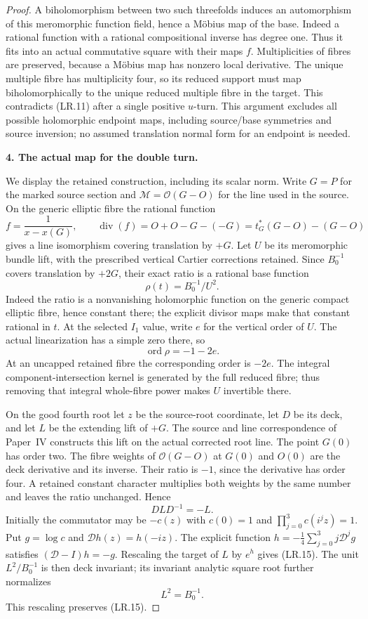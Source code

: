 \begin{proof}
A biholomorphism between two such threefolds induces an automorphism
of this meromorphic function field, hence a Möbius map of the base.
Indeed a rational function with a rational compositional inverse
has degree one. Thus it fits into an actual commutative square with
their maps \(f\). Multiplicities of fibres are preserved, because a
Möbius map has nonzero local derivative. The unique multiple fibre
has multiplicity four, so its reduced support must map biholomorphically
to the unique reduced multiple fibre in the target. This contradicts
(LR.11) after a single positive \(u\)-turn. This argument excludes
all possible holomorphic endpoint maps, including source/base
symmetries and source inversion; no assumed translation normal form
for an endpoint is needed.

\par


\medskip\noindent\textbf{4. The actual map for the double turn.}\par\nobreak
We display the retained construction, including its scalar norm.
Write $G=P$ for the marked source section and
$\mathcal M=\mathcal O(G-O)$ for the line used in the source.
On the generic elliptic fibre the rational function
\[
 f=\frac1{x-x(G)},\qquad
 \operatorname{div}(f)=O+O-G-(-G)
                       =t_G^*(G-O)-(G-O)
\]
gives a line isomorphism covering translation by $+G$.
Let $U$ be its meromorphic bundle lift, with the prescribed
vertical Cartier corrections retained. Since $B_0^{-1}$
covers translation by $+2G$, their exact ratio is a rational
base function
\[
              \rho(t)=B_0^{-1}/U^2.\tag{LR.13}
\]
Indeed the ratio is a nonvanishing holomorphic function on the
generic compact elliptic fibre, hence constant there; the
explicit divisor maps make that constant rational in $t$.
At the selected $I_1$ value, write $e$ for the vertical order
of $U$. The actual linearization has a simple zero there, so
\[
                  \operatorname{ord}\rho=-1-2e.\tag{LR.14}
\]
At an uncapped retained fibre the corresponding order is $-2e$.
The integral component-intersection kernel is generated by the
full reduced fibre; thus removing that integral whole-fibre
power makes $U$ invertible there.

On the good fourth root let $z$ be the source-root coordinate,
let $D$ be its deck, and let $L$ be the extending lift of $+G$.
The source and line correspondence of Paper~IV constructs this
lift on the actual corrected root line. The point $G(0)$ has
order two. The fibre weights of $\mathcal O(G-O)$ at $G(0)$
and $O(0)$ are the deck derivative and its inverse. Their
ratio is $-1$, since the derivative has order four. A retained
constant character multiplies both weights by the same number
and leaves the ratio unchanged. Hence
\[
                 DLD^{-1}=-L.\tag{LR.15}
\]
Initially the commutator may be $-c(z)$ with $c(0)=1$ and
$\prod_{j=0}^3c(i^jz)=1$. Put $g=\log c$ and
$\mathcal D h(z)=h(-iz)$. The explicit function
$h=-\tfrac14\sum_{j=0}^3j\mathcal D^jg$ satisfies
$(\mathcal D-I)h=-g$. Rescaling the target of $L$ by $e^h$
gives (LR.15). The unit $L^2/B_0^{-1}$ is then deck invariant;
its invariant analytic square root further normalizes
\[
                              L^2=B_0^{-1}.\tag{LR.16}
\]
This rescaling preserves (LR.15).


\end{proof}
